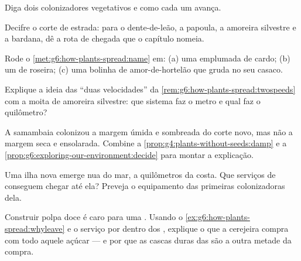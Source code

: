\begin{exercise}[$\star$]\label{exo:g6:how-plants-spread:6}
Diga dois colonizadores vegetativos e como cada um avança.
\end{exercise}

\begin{exercise}[$\star\star$]\label{exo:g6:how-plants-spread:7}
Decifre o corte de estrada: para o dente-de-leão, a papoula, a
amoreira silvestre e a bardana, dê a rota de chegada que o capítulo
nomeia.
\end{exercise}

\begin{exercise}[$\star\star$]\label{exo:g6:how-plants-spread:8}
Rode o \cref{met:g6:how-plants-spread:name} em: (a) uma 
emplumada de cardo; (b) um  de roseira; (c) uma bolinha de
amor-de-hortelão que gruda no seu casaco.
\end{exercise}

\begin{exercise}[$\star\star$]\label{exo:g6:how-plants-spread:9}
Explique a ideia das ``duas velocidades'' da
\cref{rem:g6:how-plants-spread:twospeeds} com a moita de amoreira
silvestre: que sistema faz o metro e qual faz o quilômetro?
\end{exercise}

\begin{exercise}[$\star\star$]\label{exo:g6:how-plants-spread:10}
A samambaia colonizou a margem úmida e sombreada do corte novo, mas
não a margem seca e ensolarada. Combine a
\cref{prop:g4:plants-without-seeds:damp} e a
\cref{prop:g6:exploring-our-environment:decide} para montar a
explicação.
\end{exercise}

\begin{exercise}[$\star\star$]\label{exo:g6:how-plants-spread:11}
Uma ilha nova emerge nua do mar, a quilômetros da costa. Que serviços
de  conseguem chegar até ela? Preveja o equipamento das
primeiras  colonizadoras dela.
\end{exercise}

\begin{exercise}[$\star\star\star$]\label{exo:g6:how-plants-spread:12}
Construir polpa doce é caro para uma . Usando o
\cref{ex:g6:how-plants-spread:whyleave} e o serviço por dentro dos
, explique o que a cerejeira compra com todo aquele açúcar ---
e por que as cascas duras das  são a outra metade da compra.
\end{exercise}

